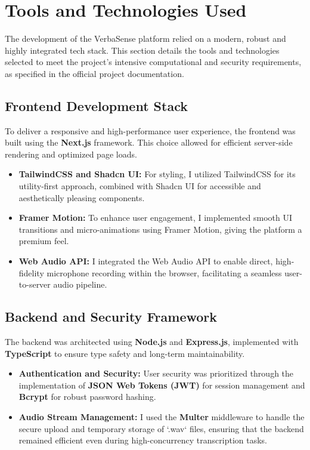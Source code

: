 \documentclass[oneside]{thesis-library}
\begin{document}
\section{Tools and Technologies Used}
The development of the VerbaSense platform relied on a modern, robust and highly integrated tech stack. This section details the tools and technologies selected to meet the project's intensive computational and security requirements, as specified in the official project documentation.

\subsection{Frontend Development Stack}
To deliver a responsive and high-performance user experience, the frontend was built using the \textbf{Next.js} framework. This choice allowed for efficient server-side rendering and optimized page loads.
\begin{itemize}
    \item \textbf{TailwindCSS and Shadcn UI:} For styling, I utilized TailwindCSS for its utility-first approach, combined with Shadcn UI for accessible and aesthetically pleasing components.
    \item \textbf{Framer Motion:} To enhance user engagement, I implemented smooth UI transitions and micro-animations using Framer Motion, giving the platform a premium feel.
    \item \textbf{Web Audio API:} I integrated the Web Audio API to enable direct, high-fidelity microphone recording within the browser, facilitating a seamless user-to-server audio pipeline.
\end{itemize}

\subsection{Backend and Security Framework}
The backend was architected using \textbf{Node.js} and \textbf{Express.js}, implemented with \textbf{TypeScript} to ensure type safety and long-term maintainability.
\begin{itemize}
    \item \textbf{Authentication and Security:} User security was prioritized through the implementation of \textbf{JSON Web Tokens (JWT)} for session management and \textbf{Bcrypt} for robust password hashing.
    \item \textbf{Audio Stream Management:} I used the \textbf{Multer} middleware to handle the secure upload and temporary storage of `.wav` files, ensuring that the backend remained efficient even during high-concurrency transcription tasks.
\end{itemize}
\end{document}
